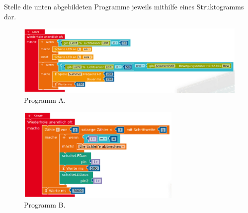 \begin{aufgabe}
	Stelle die unten abgebildeten Programme jeweils mithilfe eines Struktogramms dar.
\end{aufgabe}

\begin{figure}[H]
	\begin{adjustwidth}{-1.5cm}{1.5cm}
		\centering
		\includegraphics[width=1.2\textwidth]{./pics/wenn-sonstWenn-sonst-Bsp2.png}
		\caption{Programm A.}
	\end{adjustwidth}
\end{figure}
\begin{figure}[H]
	\centering
	\includegraphics[width=0.7\textwidth]{./pics/break-bsp-schmal.png}
	\caption{Programm B.}
\end{figure}

\newpage

